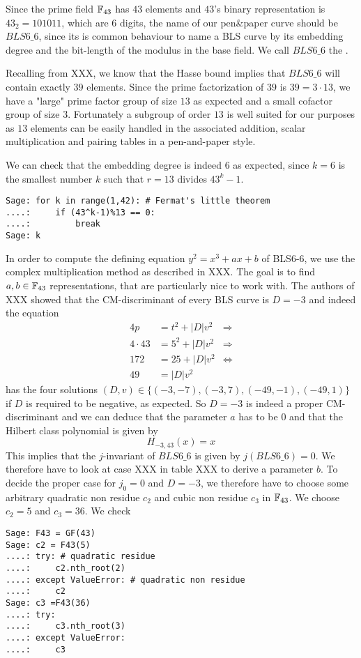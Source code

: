 Since the prime field $\mathbb{F}_{43}$ has $43$ elements and $43$'s binary representation is $43_2= 101011$, which are $6$ digits, the name of our pen\&{}paper curve should be $BLS6\_6$, since its is common behaviour to name a BLS curve by its embedding degree and the bit-length of the modulus in the base field. We call $BLS6\_6$ the .

Recalling from XXX, we know that the Hasse bound implies that $BLS6\_6$ will contain exactly $39$ elements. Since the prime factorization of $39$ is $39=3\cdot 13$, we have a "large" prime factor group of size $13$ as expected and a small cofactor group of size $3$. Fortunately a subgroup of order $13$ is well suited for our purposes as $13$ elements can be easily handled in the associated addition, scalar multiplication and pairing tables in a pen-and-paper style. 

We can check that the embedding degree is indeed $6$ as expected, since $k = 6$ is the smallest number $k$ such that $r=13$ divides $43^k-1$. 
\begin{verbatim}
Sage: for k in range(1,42): # Fermat's little theorem
....:     if (43^k-1)%13 == 0:
....:         break
Sage: k
\end{verbatim}
In order to compute the defining equation $y^2=x^3 + ax + b$ of BLS6-6, we use the complex multiplication method as described in XXX. The goal is to find $a,b\in\mathbb{F}_{43}$ representations, that are particularly nice to work with. The authors of XXX showed that the CM-discriminant of every BLS curve is $D=-3$ and indeed the equation
\begin{align*}
4p & = t^2 + |D|v^2 & \Rightarrow \\ 
4\cdot 43 & = 5^2 + |D|v^2 & \Rightarrow \\ 
172 & = 25 + |D| v^2 & \Leftrightarrow \\ 
49 & = |D| v^2
\end{align*}
has the four solutions $(D,v)\in\{(-3,-7),(-3,7),(-49,-1),(-49,1)\}$ if $D$ is required to be negative, as expected. So $D=-3$ is indeed a proper CM-discriminant and we can deduce that the parameter $a$ has to be $0$ and that the Hilbert class polynomial is given by
$$
H_{-3,43}(x) = x
$$
This implies that the $j$-invariant of $BLS6\_6$ is given by $j(BLS6\_6)=0$. We therefore have to look at case XXX in table XXX to derive a parameter $b$. To decide the proper case for $j_0=0$ and $D=-3$, we therefore have to choose some arbitrary quadratic non residue $c_2$ and cubic non residue $c_3$ in $\mathbb{F}_{43}$. We choose $c_2 =5$ and $c_3=36$. We check
\begin{verbatim}
Sage: F43 = GF(43)
Sage: c2 = F43(5)
....: try: # quadratic residue
....:     c2.nth_root(2)
....: except ValueError: # quadratic non residue
....:     c2
Sage: c3 =F43(36)
....: try:
....:     c3.nth_root(3)
....: except ValueError:
....:     c3
\end{verbatim} 


